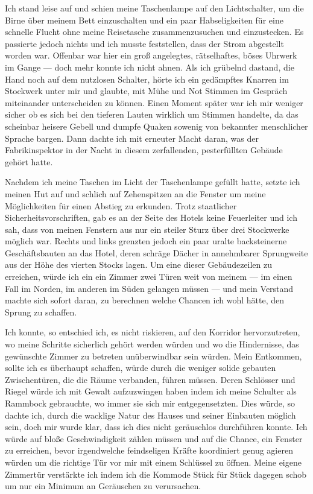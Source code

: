 Ich stand leise auf und schien meine Taschenlampe auf den Lichtschalter, um die Birne über meinem Bett einzuschalten und ein paar Habseligkeiten für eine schnelle Flucht ohne meine Reisetasche zusammenzusuchen und einzustecken. Es passierte jedoch nichts und ich musste feststellen, dass der Strom abgestellt worden war. Offenbar war hier ein groß angelegtes, rätselhaftes, böses Uhrwerk im Gange --- doch mehr konnte ich nicht ahnen. Als ich grübelnd dastand, die Hand noch auf dem nutzlosen Schalter, hörte ich ein gedämpftes Knarren im Stockwerk unter mir und glaubte, mit Mühe und Not Stimmen im Gespräch miteinander unterscheiden zu können. Einen Moment später war ich mir weniger sicher ob es sich bei den tieferen Lauten wirklich um Stimmen handelte, da das scheinbar heisere Gebell und dumpfe Quaken sowenig von bekannter menschlicher Sprache bargen. Dann dachte ich mit erneuter Macht daran, was der Fabrikinspektor in der Nacht in diesem zerfallenden, pesterfüllten Gebäude gehört hatte.

Nachdem ich meine Taschen im Licht der Taschenlampe gefüllt hatte, setzte ich meinen Hut auf und schlich auf Zehenspitzen an die Fenster um meine Möglichkeiten für einen Abstieg zu erkunden. Trotz staatlicher Sicherheitsvorschriften, gab es an der Seite des Hotels keine Feuerleiter und ich sah, dass von meinen Fenstern aus nur ein steiler Sturz über drei Stockwerke möglich war. Rechts und links grenzten jedoch ein paar uralte backsteinerne Geschäftsbauten an das Hotel, deren schräge Dächer in annehmbarer Sprungweite aus der Höhe des vierten Stocks lagen. Um eine dieser Gebäudezeilen zu erreichen, würde ich ein ein Zimmer zwei Türen weit von meinem --- im einen Fall im Norden, im anderen im Süden gelangen müssen --- und mein Verstand machte sich sofort daran, zu berechnen welche Chancen ich wohl hätte, den Sprung zu schaffen.

Ich konnte, so entschied ich, es nicht riskieren, auf den Korridor hervorzutreten, wo meine Schritte sicherlich gehört werden würden und wo die Hindernisse, das gewünschte Zimmer zu betreten unüberwindbar sein würden. Mein Entkommen, sollte ich es überhaupt schaffen, würde durch die weniger solide gebauten Zwischentüren, die die Räume verbanden, führen müssen. Deren Schlösser und Riegel würde ich mit Gewalt aufzuzwingen haben indem ich meine Schulter als Rammbock gebrauchte, wo immer sie sich mir entgegensetzten. Dies würde, so dachte ich, durch die wacklige Natur des Hauses und seiner Einbauten möglich sein, doch mir wurde klar, dass ich dies nicht geräuschlos durchführen konnte. Ich würde auf bloße Geschwindigkeit zählen müssen und auf die Chance, ein Fenster zu erreichen, bevor irgendwelche feindseligen Kräfte koordiniert genug agieren würden um die richtige Tür vor mir mit einem Schlüssel zu öffnen. Meine eigene Zimmertür verstärkte ich indem ich die Kommode Stück für Stück dagegen schob um nur ein Minimum an Geräuschen zu verursachen.

